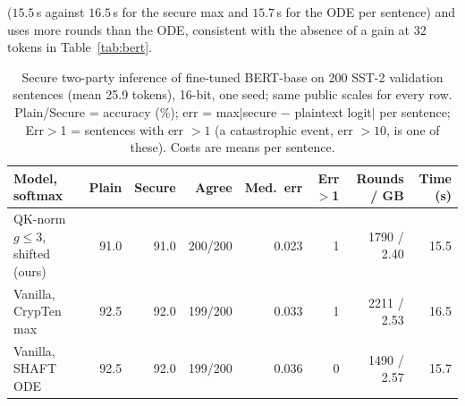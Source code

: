\documentclass[11pt]{article}
\begin{document}
($15.5$\,s against $16.5$\,s for the secure max and $15.7$\,s for the ODE per sentence) and uses more rounds than the ODE,
consistent with the absence of a gain at 32 tokens in Table~\ref{tab:bert}.

\begin{table}[tbp]\centering\footnotesize\setlength{\tabcolsep}{4pt}
\caption{Secure two-party inference of fine-tuned BERT-base on 200 SST-2 validation sentences (mean 25.9 tokens), 16-bit, one
seed; same public scales for every row. Plain/Secure = accuracy (\%); err = max$|$secure $-$ plaintext logit$|$ per sentence; Err$>$1 = sentences with err $>1$ (a catastrophic event, err $>10$, is one of these).
Costs are means per sentence.}\label{tab:sec}
\begin{tabular}{@{}lrrrrrrr@{}}\toprule
Model, softmax & Plain & Secure & Agree & Med.\ err & Err$>$1 & Rounds / GB & Time (s)\\\midrule
QK-norm $g\le3$, shifted (ours) & 91.0 & 91.0 & 200/200 & 0.023 & 1 & 1790 / 2.40 & 15.5\\
Vanilla, CrypTen max & 92.5 & 92.0 & 199/200 & 0.033 & 1 & 2211 / 2.53 & 16.5\\
Vanilla, SHAFT ODE & 92.5 & 92.0 & 199/200 & 0.036 & 0 & 1490 / 2.57 & 15.7\\\bottomrule
\end{tabular}
\end{table}
\end{document}
